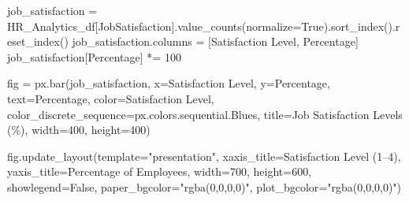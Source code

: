 \documentclass[
  letterpaper,
  DIV=11,
  numbers=noendperiod]{scrartcl}
\newenvironment{Shaded}{\begin{snugshade}}{\end{snugshade}}
\newcommand{\DecValTok}[1]{\textcolor[rgb]{0.68,0.00,0.00}{#1}}
\newcommand{\NormalTok}[1]{\textcolor[rgb]{0.00,0.23,0.31}{#1}}
\newcommand{\OperatorTok}[1]{\textcolor[rgb]{0.37,0.37,0.37}{#1}}
\newcommand{\StringTok}[1]{\textcolor[rgb]{0.13,0.47,0.30}{#1}}
\newcommand{\VariableTok}[1]{\textcolor[rgb]{0.07,0.07,0.07}{#1}}
\begin{document}
\begin{Shaded}
\begin{Highlighting}[]
\NormalTok{job\_satisfaction }\OperatorTok{=}\NormalTok{ HR\_Analytics\_df[}\StringTok{\textquotesingle{}JobSatisfaction\textquotesingle{}}\NormalTok{].value\_counts(normalize}\OperatorTok{=}\VariableTok{True}\NormalTok{).sort\_index().reset\_index()}
\NormalTok{job\_satisfaction.columns }\OperatorTok{=}\NormalTok{ [}\StringTok{\textquotesingle{}Satisfaction Level\textquotesingle{}}\NormalTok{, }\StringTok{\textquotesingle{}Percentage\textquotesingle{}}\NormalTok{]}
\NormalTok{job\_satisfaction[}\StringTok{\textquotesingle{}Percentage\textquotesingle{}}\NormalTok{] }\OperatorTok{*=} \DecValTok{100}

\NormalTok{fig }\OperatorTok{=}\NormalTok{ px.bar(job\_satisfaction,}
\NormalTok{             x}\OperatorTok{=}\StringTok{\textquotesingle{}Satisfaction Level\textquotesingle{}}\NormalTok{,}
\NormalTok{             y}\OperatorTok{=}\StringTok{\textquotesingle{}Percentage\textquotesingle{}}\NormalTok{,}
\NormalTok{             text}\OperatorTok{=}\StringTok{\textquotesingle{}Percentage\textquotesingle{}}\NormalTok{,}
\NormalTok{             color}\OperatorTok{=}\StringTok{\textquotesingle{}Satisfaction Level\textquotesingle{}}\NormalTok{,}
\NormalTok{             color\_discrete\_sequence}\OperatorTok{=}\NormalTok{px.colors.sequential.Blues,}
\NormalTok{             title}\OperatorTok{=}\StringTok{\textquotesingle{}Job Satisfaction Levels (\%)\textquotesingle{}}\NormalTok{,}
\NormalTok{             width}\OperatorTok{=}\DecValTok{400}\NormalTok{,}
\NormalTok{             height}\OperatorTok{=}\DecValTok{400}\NormalTok{)}

\NormalTok{fig.update\_layout(template}\OperatorTok{=}\StringTok{"presentation"}\NormalTok{,}
\NormalTok{                  xaxis\_title}\OperatorTok{=}\StringTok{\textquotesingle{}Satisfaction Level (1–4)\textquotesingle{}}\NormalTok{,}
\NormalTok{                  yaxis\_title}\OperatorTok{=}\StringTok{\textquotesingle{}Percentage of Employees\textquotesingle{}}\NormalTok{,}
\NormalTok{                  width}\OperatorTok{=}\DecValTok{700}\NormalTok{,}
\NormalTok{                  height}\OperatorTok{=}\DecValTok{600}\NormalTok{,}
\NormalTok{                  showlegend}\OperatorTok{=}\VariableTok{False}\NormalTok{,}
\NormalTok{                  paper\_bgcolor}\OperatorTok{=}\StringTok{"rgba(0,0,0,0)"}\NormalTok{,}
\NormalTok{                  plot\_bgcolor}\OperatorTok{=}\StringTok{"rgba(0,0,0,0)"}\NormalTok{)}



\end{Highlighting}
\end{Shaded}
\end{document}
